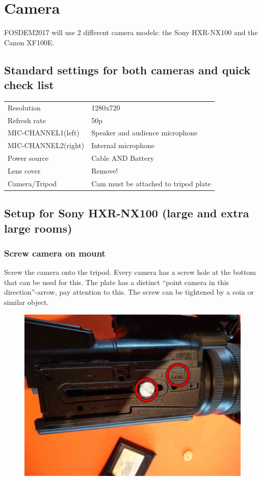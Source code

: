 \documentclass{article}
\begin{document}
\section{Camera}
FOSDEM2017 will use 2 different camera models: the Sony HXR-NX100 and the Canon XF100E.

\subsection{Standard settings for both cameras and quick check list}
\begin{tabular}{| l | l |}
Resolution & 1280x720 \\
Refresh rate & 50p \\
MIC-CHANNEL1(left) &  Speaker and audience microphone \\
MIC-CHANNEL2(right) & Internal microphone \\
Power source & Cable AND Battery \\
Lens cover & Remove! \\
Camera/Tripod & Cam must be attached to tripod plate \\
\end{tabular}

\subsection{Setup for Sony HXR-NX100 (large and extra large rooms)}

\subsubsection{Screw camera on mount}
Screw the camera onto the tripod. Every camera has a screw hole at the bottom that can be used for this. The plate has a distinct ``point camera in this direction''-arrow, pay attention to this. The screw can be tightened by a coin or similar object.

\begin{figure}[H]
  \centering
  \includegraphics[width = 120mm]{Cam00.jpg}
\end{figure}
\end{document}
